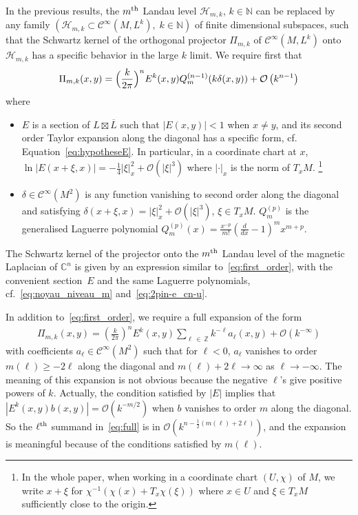 \documentclass[10pt,a4paper]{article}
\theoremstyle{definition}
\numberwithin{equation}{section}
\newcommand{\N}{{\mathbb{N}}}
\newcommand{\C}{{\mathbb{C}}}
\newcommand{\Z}{{\mathbb{Z}}}
\newcommand{\con}{\overline}
\newcommand{\Ci}{{\mathcal{C}}^{\infty}}
\newcommand{\bigo}{\mathcal{O}}
\newcommand{\Hilb}{\mathcal{H}}
\begin{document}
In the previous results, the $m^{\rm th}$ Landau level $\Hilb_{m,k}$, $k\in \N$ can be replaced by any family $(\Hilb_{m,k} \subset \Ci (M, L^k), \; k \in \N) $ of finite dimensional subspaces, such that the Schwartz kernel of the orthogonal projector $\Pi_{m,k}$ of $\Ci (M, L^k)$ onto $\Hilb_{m,k}$ has a specific behavior in the large $k$ limit. We require first that
\begin{gather}\label{eq:first_order}
\Pi_{m,k} (x,y) = \Bigl(\frac{k}{ 2\pi} \Bigr)^n E^k (x,y) Q^{(n-1)}_m (k
\delta (x,y)) + \bigo \left(k^{n-1}\right)
\end{gather}
where
\begin{itemize}
\item[-] $E$ is a section of $L \boxtimes \con{L}$ such that $|E(x,y)| < 1$ when $x \neq y$, and its second order Taylor expansion along the diagonal has a specific form, cf. Equation~\eqref{eq:hypotheseE}.  In particular, in a coordinate chart at $x$, $\ln |E(x+
\xi, x)|= - \frac{1}{4} |\xi|_x^2 + \bigo (|\xi|^3)$ where $|\cdot |_x$ is the norm of $T_xM$.  \footnote{In the whole paper, when working in a coordinate chart $(U, \chi)$ of $M$, we write $x+ \xi$ for $ \chi^{-1} (
\chi (x) + T_x \chi (\xi))$ where $x \in U$ and $\xi \in T_xM$ sufficiently close to the origin.}
\item[-] $\delta \in \Ci (M^2)$ is any function vanishing to second order along the diagonal and satisfying $\delta (x+ \xi, x) = |\xi|_x^2 + \bigo (|\xi|^3)$, $\xi \in T_xM$. $Q_m^{(p)} $ is the generalised Laguerre polynomial $Q^{(p)}_m (x) = \frac{x^{-p}}{m!} (\frac{d}{dx} -1 ) ^m x ^{m+p}$.
\end{itemize}
The Schwartz kernel of the projector onto the $m^{\rm th}$ Landau level of the magnetic Laplacian of $\C^n$ is given by an expression similar to~\eqref{eq:first_order}, with the convenient section~$E$ and the same Laguerre polynomials, cf.~\eqref{eq:noyau_niveau_m} and~\eqref{eq:2pin-e_cn-u}. 

In addition to~\eqref{eq:first_order}, we require a full expansion of the form
\begin{gather}\label{eq:full}
\Pi_{m,k} (x,y) = \left(\frac{k}{ 2\pi} \right)^n E^k (x,y) \sum _{\ell\,\in\,\Z} k^{-\ell} a_{\ell} (x,y) + \bigo (k^{-\infty})
\end{gather}
with coefficients $a_{\ell} \in \Ci (M^2)$ such that for $\ell<0$, $a_{\ell}$ vanishes to order $m(\ell) \geqslant -2 \ell$ along the diagonal and $m(\ell) + 2\ell \rightarrow
\infty $ as $\ell \rightarrow - \infty$. The meaning of this expansion is not obvious because the negative $\ell$'s give positive powers of $k$. Actually, the condition satisfied by $|E|$ implies that $|E^k (x,y) b(x,y) | = \bigo (k^{-m/2})$ when $b$ vanishes to order $m$ along the diagonal. So the $\ell^{\rm th}$ summand in~\eqref{eq:full} is in $\bigo (k^{n - \frac{1}{2} (m (\ell) + 2\ell)})$, and the expansion is meaningful because of the conditions satisfied by $m (\ell)$.
\end{document}
